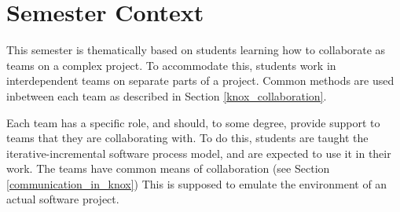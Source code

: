 \section{Semester Context}
This semester is thematically based on students learning how to collaborate as teams on a complex project. 
To accommodate this, students work in interdependent teams on separate parts of a project. 
Common methods are used inbetween each team as described in Section \ref{knox_collaboration}. 

Each team has a specific role, and should, to some degree, provide support to teams that they are collaborating with.
To do this, students are taught the iterative-incremental software process model\cite{SoftwareProcessModels}, and are expected to use it in their work. The teams have common means of collaboration (see Section \ref{communication_in_knox})
This is supposed to emulate the environment of an actual software project. 


% 



% 

